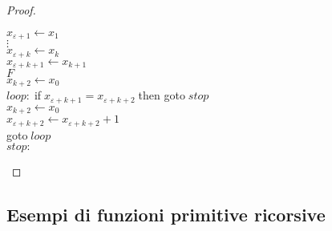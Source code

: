 \begin{proof}
\begin{enumerate}
\begin{mylisting}
$x_{\varepsilon+1}\leftarrow x_{1}$\\
$\vdots$\\
$x_{\varepsilon+k}\leftarrow x_{k}$\\
$x_{\varepsilon+k+1}\leftarrow x_{k+1}$\\
$F$\\
$x_{k+2}\leftarrow x_{0}$\\
$loop:\; $if$\; x_{\varepsilon+k+1}=x_{\varepsilon+k+2}\; $then goto$\;stop$\\
$x_{k+2}\leftarrow x_{0}$\\
$x_{\varepsilon+k+2}\leftarrow x_{\varepsilon+k+2}+1$\\
goto$\; loop$\\
$stop:$
\end{mylisting}
\end{enumerate}
\end{proof}

\subsection{Esempi di funzioni primitive ricorsive}

